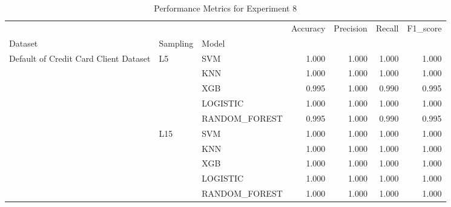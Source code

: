 \begin{table}
\caption{Performance Metrics for Experiment 8}
\label{tab:experiment_8_results}
\begin{tabular}{lllrrrr}
\toprule
 &  &  & Accuracy & Precision & Recall & F1\_score \\
Dataset & Sampling & Model &  &  &  &  \\
\midrule
\multirow[t]{10}{*}{Default of Credit Card Client Dataset} & \multirow[t]{5}{*}{L5} & SVM & 1.000 & 1.000 & 1.000 & 1.000 \\
 &  & KNN & 1.000 & 1.000 & 1.000 & 1.000 \\
 &  & XGB & 0.995 & 1.000 & 0.990 & 0.995 \\
 &  & LOGISTIC & 1.000 & 1.000 & 1.000 & 1.000 \\
 &  & RANDOM\_FOREST & 0.995 & 1.000 & 0.990 & 0.995 \\
\cline{2-7}
 & \multirow[t]{5}{*}{L15} & SVM & 1.000 & 1.000 & 1.000 & 1.000 \\
 &  & KNN & 1.000 & 1.000 & 1.000 & 1.000 \\
 &  & XGB & 1.000 & 1.000 & 1.000 & 1.000 \\
 &  & LOGISTIC & 1.000 & 1.000 & 1.000 & 1.000 \\
 &  & RANDOM\_FOREST & 1.000 & 1.000 & 1.000 & 1.000 \\
\cline{1-7} \cline{2-7}
\bottomrule
\end{tabular}
\end{table}
